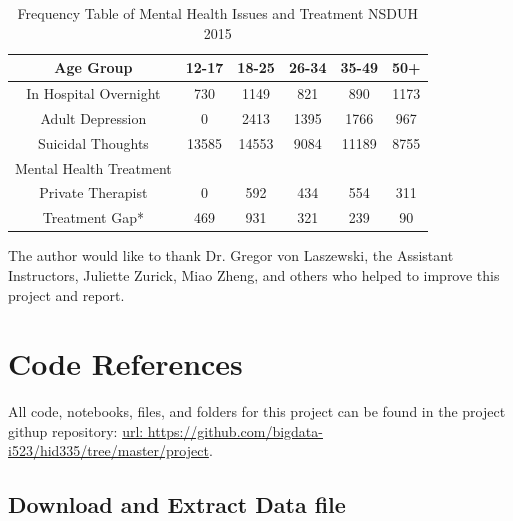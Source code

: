 \documentclass[sigconf]{acmart}
\begin{document}

\begin{table}
  \caption{Frequency Table of Mental Health Issues and Treatment NSDUH 2015
  \cite{samhsa16}}
  \label{tab:freq}
  \begin{tabular}{cccccc}
    \toprule
    Age Group & 12-17& 18-25& 26-34& 35-49& 50+\\
    \midrule
    In Hospital Overnight& 730& 1149& 821& 890& 1173 \\
    Adult Depression& 0& 2413& 1395& 1766& 967 \\
    Suicidal Thoughts& 13585& 14553& 9084& 11189& 8755 \\
    \midrule
    Mental Health Treatment& & & & & \\
    \midrule
    Private Therapist& 0& 592& 434& 554& 311 \\
    Treatment Gap*& 469& 931& 321& 239& 90 \\
    \bottomrule
  \end{tabular}
\end{table}



\begin{acks}

  The author would like to thank Dr. Gregor von Laszewski, 
  the Assistant Instructors, Juliette Zurick, Miao Zheng,
  and others who helped to improve this project and report.

\end{acks}


 


\appendix



\section{Code References}

All code, notebooks, files, and folders for this project can be found in the
project githup repository: \url{url:  https://github.com/bigdata-i523/hid335/tree/master/project}.

\subsection{Download and Extract Data file \cite{getdata17}}
\end{document}

